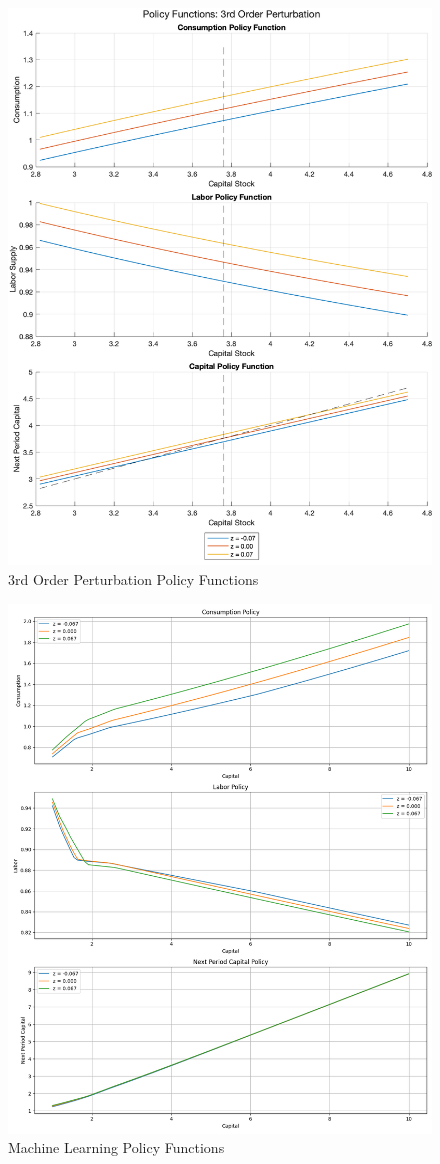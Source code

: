 \documentclass[12pt]{article}
\theoremstyle{plain}
\theoremstyle{definition}
\theoremstyle{remark}
\begin{document}
	\begin{figure}[H]
		\centering
		\includegraphics[width=\textwidth]{q3fin.png}
		\caption{3rd Order Perturbation Policy Functions}
	\end{figure}
	\pagebreak
	
	\begin{figure}[H]
		\centering
		\includegraphics[width=\textwidth]{q4fin.png}
		\caption{Machine Learning Policy Functions}
	\end{figure}
\end{document}
